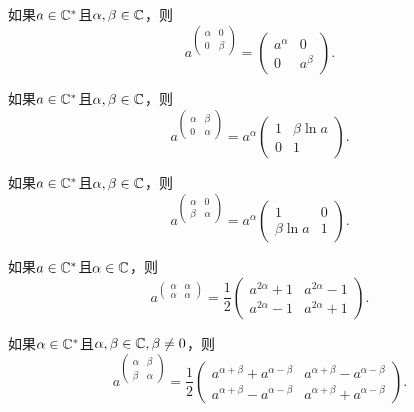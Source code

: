 \begin{corollary}[特殊幂矩阵函数]
  \begin{enum}
    \item 如果$a\in\mathbb C^\ast$且$\alpha,\beta\in\mathbb C$，则
        \[
          a^{\begin{pmatrix}
            \alpha & 0 \\
            0 & \beta
          \end{pmatrix}} = \begin{pmatrix}
            a^\alpha & 0 \\
            0 & a^\beta
          \end{pmatrix}.
        \]
    \item 如果$a\in\mathbb C^\ast$且$\alpha,\beta\in\mathbb C$，则
        \[
          a^{\begin{pmatrix}
            \alpha & \beta \\
            0 & \alpha
          \end{pmatrix}} =
          a^\alpha \begin{pmatrix}
            1 & \beta \ln a \\
            0 & 1
          \end{pmatrix}.
        \]
    \item 如果$a\in\mathbb C^\ast$且$\alpha,\beta\in\mathbb C$，则
        \[
          a^{\begin{pmatrix}
            \alpha & 0 \\
            \beta & \alpha
          \end{pmatrix}} = a^\alpha \begin{pmatrix}
            1 & 0 \\
            \beta \ln a & 1
          \end{pmatrix}.
        \]
    \item 如果$a\in\mathbb C^\ast$且$\alpha\in\mathbb C$，则
        \[
          a^{\begin{pmatrix}
            \alpha & \alpha \\
            \alpha & \alpha
          \end{pmatrix}} = \frac12 \begin{pmatrix}
            a^{2\alpha} + 1 & a^{2\alpha} - 1 \\
            a^{2\alpha} - 1 & a^{2\alpha} + 1
          \end{pmatrix}.
        \]
    \item 如果$\alpha\in\mathbb C^\ast$且$\alpha,\beta\in\mathbb C,\beta\ne0$，则
        \[
          a^{\begin{pmatrix}
            \alpha & \beta \\
            \beta & \alpha
          \end{pmatrix}} = \frac12 \begin{pmatrix}
            a^{\alpha+\beta} + a^{\alpha-\beta} & a^{\alpha+\beta} - a^{\alpha-\beta} \\
            a^{\alpha+\beta} - a^{\alpha-\beta} & a^{\alpha+\beta} + a^{\alpha-\beta}
          \end{pmatrix}.
        \]
  \end{enum}
\end{corollary}

